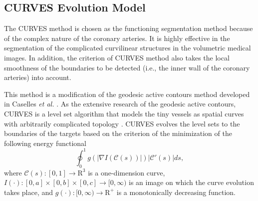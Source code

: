 \subsection{CURVES Evolution Model}

The CURVES method \cite{Lorigo2001} is chosen as the functioning segmentation method because of the complex nature of the coronary arteries.
It is highly effective in the segmentation of the complicated curvilinear structures in the volumetric medical images.
In addition, the criterion of CURVES method also takes the local smoothness of the boundaries to be detected (i.e., the inner wall of the coronary arteries) into account.

This method is a modification of the geodesic active contours method developed in Caselles \textit{et al.} \cite{Caselles1997}.
As the extensive research of the geodesic active contours, CURVES is a level set algorithm that models the tiny vessels as spatial curves with arbitrarily complicated topology \cite{Lorigo2001}. %
CURVES evolves the level sets to the boundaries of the targets based on the criterion of the minimization of the following energy functional
\begin{equation}
\label{eqn:CURVES}
\oint_0^1 g\left( \left| \nabla I \left( \mathcal{C} \left(  s \right) \right) \right| \right) \left| \mathcal{C}'\left( s \right) \right| ds,
\end{equation}
where $\mathcal{C}\left( s \right): [0,1] \rightarrow \mathrm{R}^3$ is a one-dimension curve, $I\left( \cdot \right): [0, a] \times [0, b] \times [0, c] \rightarrow [0, \infty)$ is an image on which the curve evolution takes place, and $g\left( \cdot \right): [0, \infty) \rightarrow \mathrm{R}^+$ is a monotonically decreasing function. %

